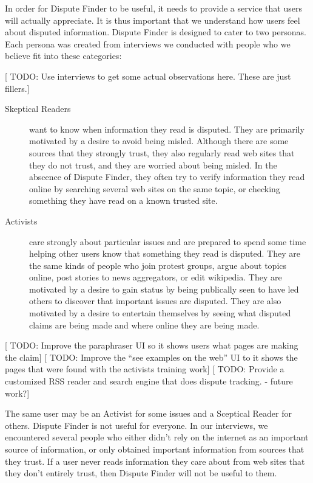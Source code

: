 \documentclass{www2010-submission}
\newcommand{\todo}[1]{{[\color{blue} TODO: #1]}}
\begin{document}
In order for Dispute Finder to be useful, it needs to provide a service that users will actually appreciate. It is thus important that we understand how users feel about disputed information. Dispute Finder is designed to cater to two personas. Each persona was created from interviews we conducted with people who we believe fit into these categories:

\todo{Use interviews to get some actual observations here. These are just fillers.}

\begin{description}

\item[Skeptical Readers] want to know when information they read is disputed. They are primarily motivated by a desire to avoid being misled. Although there are some sources that they strongly trust, they also regularly read web sites that they do not trust, and they are worried about being misled. In the abscence of Dispute Finder, they often try to verify information they read online by searching several web sites on the same topic, or checking something they have read on a known trusted site.

\item[Activists] care strongly about particular issues and are prepared to spend some time helping other users know that something they read is disputed. They are the same kinds of people who join protest groups, argue about topics online, post stories to news aggregators, or edit wikipedia. They are motivated by a desire to gain status by being publically seen to have led others to discover that important issues are disputed. They are also motivated by a desire to entertain themselves by seeing what disputed claims are being made and where online they are being made.

\end{description}

\todo{Improve the paraphraser UI so it shows users what pages are making the claim}
\todo{Improve the ``see examples on the web'' UI to it shows the pages that were found with the activists training work}
\todo{Provide a customized RSS reader and search engine that does dispute tracking. - future work?}

The same user may be an Activist for some issues and a Sceptical Reader for others. Dispute Finder is not useful for everyone. In our interviews, we encountered several people who either didn't rely on the internet as an important source of information, or only obtained important information from sources that they trust. If a user never reads information they care about from web sites that they don't entirely trust, then Dispute Finder will not be useful to them.
\end{document}
